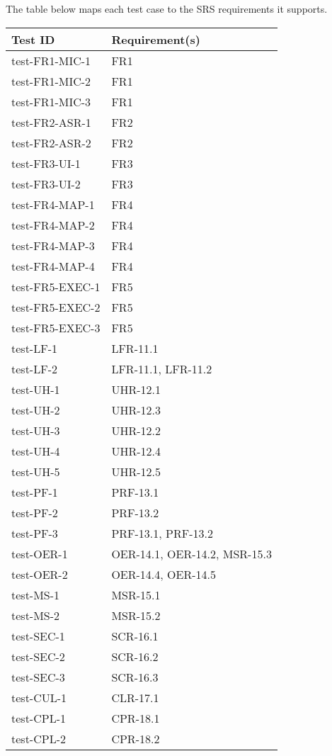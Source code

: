 \documentclass[12pt, titlepage]{article}
\begin{document}
The table below maps each test case to the SRS requirements it supports.

\begin{center}
\renewcommand{\arraystretch}{1.15}
\begin{tabular}{|l|l|}
\hline
\textbf{Test ID} & \textbf{Requirement(s)} \\
\hline
test-FR1-MIC-1 & FR1 \\
test-FR1-MIC-2 & FR1 \\
test-FR1-MIC-3 & FR1 \\
test-FR2-ASR-1 & FR2 \\
test-FR2-ASR-2 & FR2 \\
test-FR3-UI-1 & FR3 \\
test-FR3-UI-2 & FR3 \\
test-FR4-MAP-1 & FR4 \\
test-FR4-MAP-2 & FR4 \\
test-FR4-MAP-3 & FR4 \\
test-FR4-MAP-4 & FR4 \\
test-FR5-EXEC-1 & FR5 \\
test-FR5-EXEC-2 & FR5 \\
test-FR5-EXEC-3 & FR5 \\
test-LF-1 & LFR-11.1 \\
test-LF-2 & LFR-11.1, LFR-11.2 \\
test-UH-1 & UHR-12.1 \\
test-UH-2 & UHR-12.3 \\
test-UH-3 & UHR-12.2 \\
test-UH-4 & UHR-12.4 \\
test-UH-5 & UHR-12.5 \\
test-PF-1 & PRF-13.1 \\
test-PF-2 & PRF-13.2 \\
test-PF-3 & PRF-13.1, PRF-13.2 \\
test-OER-1 & OER-14.1, OER-14.2, MSR-15.3 \\
test-OER-2 & OER-14.4, OER-14.5 \\
test-MS-1 & MSR-15.1 \\
test-MS-2 & MSR-15.2 \\
test-SEC-1 & SCR-16.1 \\
test-SEC-2 & SCR-16.2 \\
test-SEC-3 & SCR-16.3 \\
test-CUL-1 & CLR-17.1 \\
test-CPL-1 & CPR-18.1 \\
test-CPL-2 & CPR-18.2 \\
\hline
\end{tabular}
\end{center}
\end{document}
